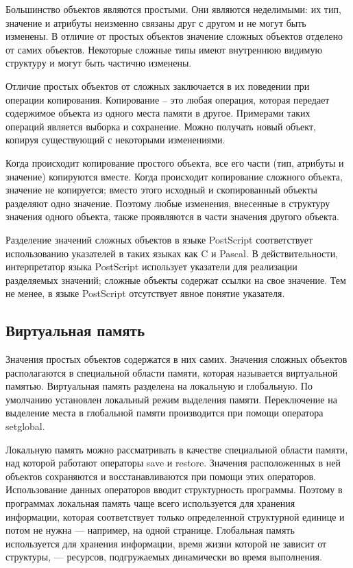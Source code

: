 Большинство объектов являются простыми. Они являются неделимыми: их тип, значение и атрибуты неизменно связаны друг с другом и не могут быть изменены. В отличие от простых объектов значение сложных объектов отделено от самих объектов. Некоторые сложные типы имеют внутреннюю видимую структуру и могут быть частично изменены.

Отличие простых объектов от сложных заключается в их поведении при операции копирования. Копирование – это любая операция, которая передает содержимое объекта из одного места памяти в другое. Примерами таких операций является выборка и сохранение. Можно получать новый объект, копируя существующий с некоторыми изменениями.

Когда происходит копирование простого объекта, все его части (тип, атрибуты и значение) копируются вместе. Когда происходит копирование сложного объекта, значение не копируется; вместо этого исходный и скопированный объекты разделяют одно значение.  Поэтому любые изменения, внесенные в структуру значения одного объекта, также проявляются в части значения другого объекта.

Разделение значений сложных объектов в языке PostScript соответствует использованию указателей в таких языках как C и Pascal. В действительности, интерпретатор языка PostScript использует указатели для реализации разделяемых значений; сложные объекты содержат ссылки на свое значение. Тем не менее, в языке PostScript отсутствует явное понятие указателя.


\subsection{Виртуальная память}

Значения простых объектов содержатся в них самих. Значения сложных объектов располагаются в специальной области памяти, которая называется виртуальной памятью. Виртуальная память разделена на локальную и глобальную. По умолчанию установлен локальный режим выделения памяти. Переключение на выделение места в глобальной памяти производится при помощи оператора setglobal.

Локальную память можно рассматривать в качестве специальной области памяти, над которой работают операторы save и restore. Значения расположенных в ней объектов сохраняются и восстанавливаются при помощи этих операторов. Использование данных операторов вводит структурность программы. Поэтому в программах локальная память чаще всего используется для хранения информации, которая соответствует только определенной структурной единице и потом не нужна --- например, на одной странице.  Глобальная память используется для хранения информации, время жизни которой не зависит от структуры, --- ресурсов, подгружаемых динамически во время выполнения.


